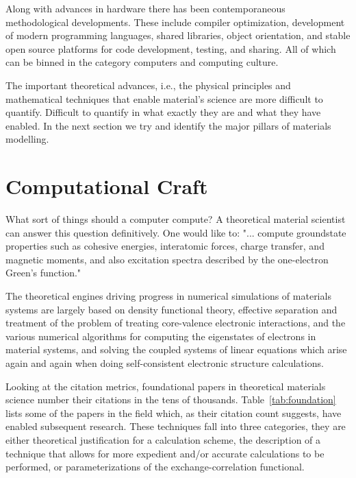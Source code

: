 Along with advances in hardware there has been contemporaneous methodological developments.
These include compiler optimization, development of modern programming languages, 
shared libraries, object orientation, and stable open source platforms for 
code development, testing, and sharing. All of which can be binned in the 
category computers and computing culture.

The important theoretical advances, i.e., the physical principles and
mathematical techniques that enable material's science are more difficult to quantify. 
Difficult to quantify in what exactly they are and what they have enabled. In the
next section we try and identify the major pillars of materials modelling.

\section{Computational Craft}

What sort of things should a computer compute? A theoretical material scientist
can answer this question definitively. One would like to:
"... compute groundstate properties such as cohesive energies, interatomic forces, 
charge transfer, and magnetic moments, and also excitation spectra described 
by the one-electron Green's function."\cite{anderson75} 

The theoretical engines driving progress in numerical simulations of materials systems are
largely based on density functional theory, effective separation and treatment of the problem
of treating core-valence electronic interactions, and the various numerical algorithms for 
computing the eigenstates of electrons in material systems, and solving the coupled systems of linear equations which arise 
again and again when doing self-consistent electronic structure calculations.

Looking at the citation metrics, foundational papers in theoretical materials science
number their citations in the tens of thousands. Table~\ref{tab:foundation} lists some of the papers in the field which, as
their citation count suggests, have enabled subsequent research. These techniques fall into
three categories, they are either theoretical justification for a calculation scheme, the description of
a technique that allows for more expedient and/or accurate calculations to be performed, 
or parameterizations of the exchange-correlation functional.

